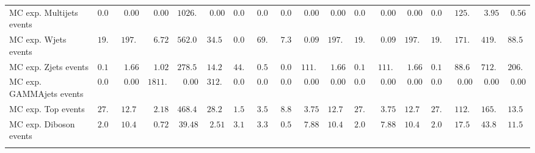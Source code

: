 \begin{table}
{\begin{tabular*}{\textwidth}{@{\extracolsep{\fill}}lrrrrrrrrrrrrrrrrr}
\noalign{\smallskip}\hline\noalign{\smallskip}
        MC exp. Multijets events         & $0.00$          & $0.00$          & $0.00$          & $1026.97$          & $0.00$          & $0.00$          & $0.00$          & $0.00$          & $0.00$          & $0.00$          & $0.00$          & $0.00$          & $0.00$          & $0.00$          & $125.32$          & $3.95$          & $0.56$              \\
        MC exp. Wjets events         & $19.91$          & $197.80$          & $6.72$          & $562.06$          & $34.57$          & $0.01$          & $69.03$          & $7.34$          & $0.09$          & $197.80$          & $19.91$          & $0.09$          & $197.80$          & $19.91$          & $171.45$          & $419.57$          & $88.54$              \\
        MC exp. Zjets events         & $0.18$          & $1.66$          & $1.02$          & $278.59$          & $14.26$          & $44.28$          & $0.59$          & $0.09$          & $111.72$          & $1.66$          & $0.18$          & $111.72$          & $1.66$          & $0.18$          & $88.61$          & $712.74$          & $206.33$              \\
        MC exp. GAMMAjets events         & $0.00$          & $0.00$          & $1811.20$          & $0.00$          & $312.71$          & $0.00$          & $0.00$          & $0.00$          & $0.00$          & $0.00$          & $0.00$          & $0.00$          & $0.00$          & $0.00$          & $0.00$          & $0.00$          & $0.00$              \\
        MC exp. Top events         & $27.15$          & $12.74$          & $2.18$          & $468.48$          & $28.27$          & $1.59$          & $3.56$          & $8.86$          & $3.75$          & $12.74$          & $27.15$          & $3.75$          & $12.74$          & $27.15$          & $112.78$          & $165.46$          & $13.53$              \\
        MC exp. Diboson events         & $2.09$          & $10.46$          & $0.72$          & $39.48$          & $2.51$          & $3.18$          & $3.39$          & $0.54$          & $7.88$          & $10.46$          & $2.09$          & $7.88$          & $10.46$          & $2.09$          & $17.51$          & $43.80$          & $11.57$              \\
\noalign{\smallskip}\hline\noalign{\smallskip}
\end{tabular*}
}
\end{table}
